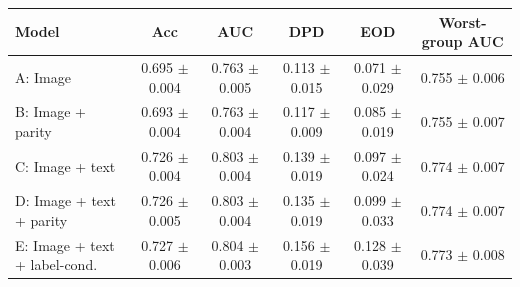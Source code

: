 \begin{tabular}{lccccc}
\toprule
Model & Acc & AUC & DPD & EOD & Worst-group AUC \\
\midrule
A: Image & 0.695 $\pm$ 0.004 & 0.763 $\pm$ 0.005 & 0.113 $\pm$ 0.015 & 0.071 $\pm$ 0.029 & 0.755 $\pm$ 0.006 \\
B: Image + parity & 0.693 $\pm$ 0.004 & 0.763 $\pm$ 0.004 & 0.117 $\pm$ 0.009 & 0.085 $\pm$ 0.019 & 0.755 $\pm$ 0.007 \\
C: Image + text & 0.726 $\pm$ 0.004 & 0.803 $\pm$ 0.004 & 0.139 $\pm$ 0.019 & 0.097 $\pm$ 0.024 & 0.774 $\pm$ 0.007 \\
D: Image + text + parity & 0.726 $\pm$ 0.005 & 0.803 $\pm$ 0.004 & 0.135 $\pm$ 0.019 & 0.099 $\pm$ 0.033 & 0.774 $\pm$ 0.007 \\
E: Image + text + label-cond. & 0.727 $\pm$ 0.006 & 0.804 $\pm$ 0.003 & 0.156 $\pm$ 0.019 & 0.128 $\pm$ 0.039 & 0.773 $\pm$ 0.008 \\
\bottomrule
\end{tabular}
